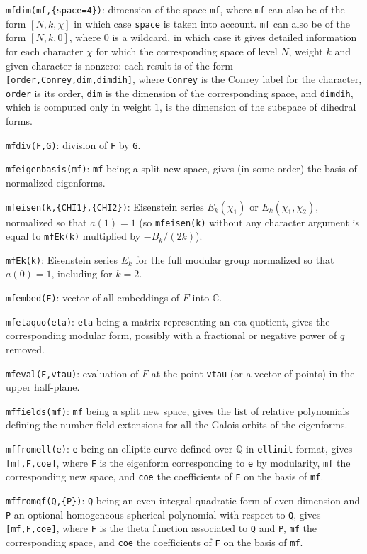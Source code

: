 \documentclass[11pt]{article}
\newcommand{\Q}{{\mathbb Q}}
\newcommand{\C}{{\mathbb C}}
\def\kbd#1{{\tt #1}}
\begin{document}
\kbd{mfdim(mf,\{space=4\})}: dimension of the space \kbd{mf}, where \kbd{mf}
can also be of the form $[N,k,\chi]$ in which case \kbd{space} is taken into
account. \kbd{mf} can also be of the form $[N,k,0]$, where $0$ is a wildcard,
in which case it gives detailed information for each character $\chi$
for which the corresponding space of level $N$, weight $k$ and given
character is nonzero: each result is of the form
\kbd{[order,Conrey,dim,dimdih]}, where \kbd{Conrey} is the
Conrey label for the character, \kbd{order} is its order, \kbd{dim} is
the dimension of the corresponding space, and \kbd{dimdih}, which is
computed only in weight $1$, is the dimension of the subspace of dihedral
forms.

\kbd{mfdiv(F,G)}: division of \kbd{F} by \kbd{G}.

\kbd{mfeigenbasis(mf)}: \kbd{mf} being a split new space, gives (in some order)
the basis of normalized eigenforms.

\kbd{mfeisen(k,\{CHI1\},\{CHI2\})}: Eisenstein series $E_k(\chi_1)$ or
$E_k(\chi_1,\chi_2)$, normalized so that $a(1)=1$ (so \kbd{mfeisen(k)} without
any character argument is equal to \kbd{mfEk(k)} multiplied by $-B_k/(2k)$).

\kbd{mfEk(k)}: Eisenstein series $E_k$ for the full modular group normalized
so that $a(0)=1$, including for $k=2$.

\kbd{mfembed(F)}: vector of all embeddings of $F$ into $\C$.

\kbd{mfetaquo(eta)}: \kbd{eta} being a matrix representing an eta quotient,
gives the corresponding modular form, possibly with a fractional or negative
power of $q$ removed.

\kbd{mfeval(F,vtau)}: evaluation of $F$ at the point \kbd{vtau} (or a
vector of points) in the upper half-plane.

\kbd{mffields(mf)}: \kbd{mf} being a split new space, gives the list of
relative polynomials defining the number field extensions for all the Galois
orbits of the eigenforms.

\kbd{mffromell(e)}: \kbd{e} being an elliptic curve defined over $\Q$ in
\kbd{ellinit} format, gives \kbd{[mf,F,coe]}, where \kbd{F} is the eigenform
corresponding to \kbd{e} by modularity, \kbd{mf} the corresponding new space,
and \kbd{coe} the coefficients of \kbd{F} on the basis of \kbd{mf}.

\kbd{mffromqf(Q,\{P\})}: \kbd{Q} being an even integral quadratic form of even
dimension and \kbd{P} an optional homogeneous spherical polynomial with
respect to \kbd{Q}, gives \kbd{[mf,F,coe]}, where \kbd{F} is the theta
function associated to \kbd{Q} and \kbd{P}, \kbd{mf} the corresponding space,
and \kbd{coe} the coefficients of \kbd{F} on the basis of \kbd{mf}.
\end{document}
